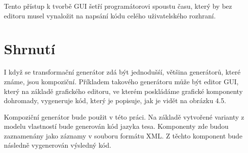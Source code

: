 Tento přístup k tvorbě GUI šetří programátorovi spoustu času, který by bez editoru musel vynaložit na napsání kódu celého uživatelského rozhraní.

\section{Shrnutí}
I když se transformační generátor zdá být jednodušśí, většina generátorů, které známe, jsou kompoziční. Příkladem takového generátoru může být editor GUI, který na základě grafického editoru, ve kterém poskládáme grafické komponenty dohromady, vygeneruje kód, který je popisuje, jak je vidět na obrázku 4.5.

Kompoziční generátor bude použit v této práci. Na základě vytvořené varianty z modelu vlastností bude generován kód jazyka tesa. Komponenty zde budou zaznamenány jako záznamy v souboru formátu XML. Z těchto komponent bude následně vygenerován výsledný kód.



